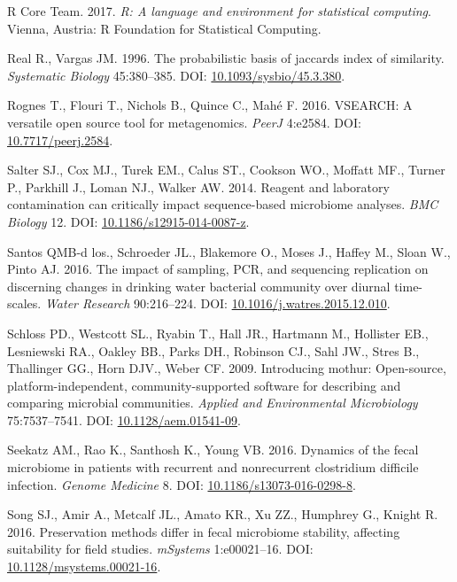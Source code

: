 \documentclass[11pt,]{article}
\begin{document}
\hypertarget{ref-r_citation_2017}{}
R Core Team. 2017. \emph{R: A language and environment for statistical
computing}. Vienna, Austria: R Foundation for Statistical Computing.

\hypertarget{ref-Real1996}{}
Real R., Vargas JM. 1996. The probabilistic basis of jaccards index of
similarity. \emph{Systematic Biology} 45:380--385. DOI:
\href{https://doi.org/10.1093/sysbio/45.3.380}{10.1093/sysbio/45.3.380}.

\hypertarget{ref-vsearch_Rognes_2016}{}
Rognes T., Flouri T., Nichols B., Quince C., Mahé F. 2016. VSEARCH: A
versatile open source tool for metagenomics. \emph{PeerJ} 4:e2584. DOI:
\href{https://doi.org/10.7717/peerj.2584}{10.7717/peerj.2584}.

\hypertarget{ref-contamination_Salter2014}{}
Salter SJ., Cox MJ., Turek EM., Calus ST., Cookson WO., Moffatt MF.,
Turner P., Parkhill J., Loman NJ., Walker AW. 2014. Reagent and
laboratory contamination can critically impact sequence-based microbiome
analyses. \emph{BMC Biology} 12. DOI:
\href{https://doi.org/10.1186/s12915-014-0087-z}{10.1186/s12915-014-0087-z}.

\hypertarget{ref-BautistadelosSantos2016}{}
Santos QMB-d los., Schroeder JL., Blakemore O., Moses J., Haffey M.,
Sloan W., Pinto AJ. 2016. The impact of sampling, PCR, and sequencing
replication on discerning changes in drinking water bacterial community
over diurnal time-scales. \emph{Water Research} 90:216--224. DOI:
\href{https://doi.org/10.1016/j.watres.2015.12.010}{10.1016/j.watres.2015.12.010}.

\hypertarget{ref-mothur_schloss_2009}{}
Schloss PD., Westcott SL., Ryabin T., Hall JR., Hartmann M., Hollister
EB., Lesniewski RA., Oakley BB., Parks DH., Robinson CJ., Sahl JW.,
Stres B., Thallinger GG., Horn DJV., Weber CF. 2009. Introducing mothur:
Open-source, platform-independent, community-supported software for
describing and comparing microbial communities. \emph{Applied and
Environmental Microbiology} 75:7537--7541. DOI:
\href{https://doi.org/10.1128/aem.01541-09}{10.1128/aem.01541-09}.

\hypertarget{ref-erin_seekatz_2016}{}
Seekatz AM., Rao K., Santhosh K., Young VB. 2016. Dynamics of the fecal
microbiome in patients with recurrent and nonrecurrent clostridium
difficile infection. \emph{Genome Medicine} 8. DOI:
\href{https://doi.org/10.1186/s13073-016-0298-8}{10.1186/s13073-016-0298-8}.

\hypertarget{ref-preservation_Song_2016}{}
Song SJ., Amir A., Metcalf JL., Amato KR., Xu ZZ., Humphrey G., Knight
R. 2016. Preservation methods differ in fecal microbiome stability,
affecting suitability for field studies. \emph{mSystems} 1:e00021--16.
DOI:
\href{https://doi.org/10.1128/msystems.00021-16}{10.1128/msystems.00021-16}.
\end{document}
